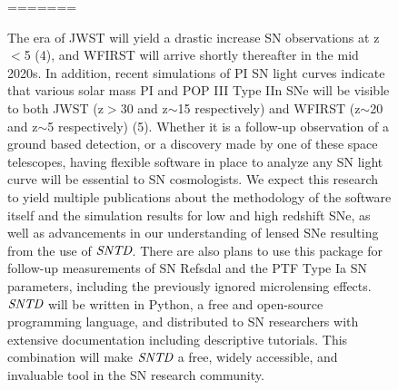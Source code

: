 \begin{figure}[h]

=======

 The era of JWST will yield a drastic increase SN observations at
z$<$5 (4), and WFIRST will arrive shortly thereafter in the mid
2020s. In addition, recent simulations of PI SN light curves indicate
that various solar mass PI and POP III Type IIn SNe will be visible to
both JWST (z$>$30 and z$\sim$15 respectively) and WFIRST (z$\sim$20
and z$\sim$5 respectively) (5). Whether it is a follow-up observation
of a ground based detection, or a discovery made by one of these space
telescopes, having flexible software in place to analyze any SN light
curve will be essential to SN cosmologists. We expect this research to
yield multiple publications about the methodology of the software
itself and the simulation results for low and high redshift SNe, as
well as advancements in our understanding of lensed SNe resulting from
the use of $\textit{SNTD}$. There are also plans to use this package
for follow-up measurements of SN Refsdal and the PTF Type Ia SN
parameters, including the previously ignored microlensing
effects. $\textit{SNTD}$ will be written in Python, a free and
open-source programming language, and distributed to SN researchers
with extensive documentation including descriptive tutorials. This
combination will make $\textit{SNTD}$ a free, widely accessible, and
invaluable tool in the SN research community.  
\begin{figure}[h]


\end{figure}
\end{figure}
